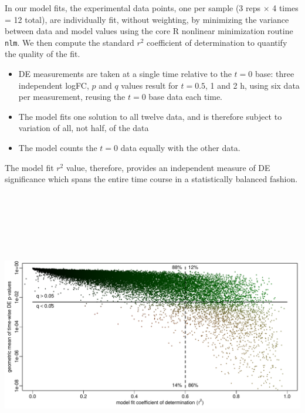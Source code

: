 \documentclass[aspb,landscape]{a0poster}
\newlength{\figtopspace}
\begin{document}
\begin{multicols}{3}
  In our model fits, the experimental data points, one per sample (3 reps $\times$ 4 times = 12 total),
  are individually fit, without weighting, by minimizing the variance between data and model values using the core R nonlinear minimization routine \texttt{nlm}. We then compute the standard $r^2$ coefficient
  of determination to quantify the quality of the fit.
  \begin{itemize}
  \item DE measurements are taken at a single time relative to the $t=0$ base: three independent logFC, $p$ and $q$ values result for $t=0.5$, 1 and 2 h, using six data per measurement, reusing the $t=0$ base data each time.
  \item The model fits one solution to all twelve data, and is therefore subject to variation of all, not half, of the data
  \item The model counts the $t=0$ data equally with the other data.
  \end{itemize}
  The model fit $r^2$ value, therefore, provides an independent measure of DE significance which spans the entire time course in a statistically balanced fashion.

  \begin{center}\vspace{\figtopspace}
    \includegraphics[width=10in,height=5in]{p-vs-r2}
  \end{center}


\end{multicols}
\end{document}

